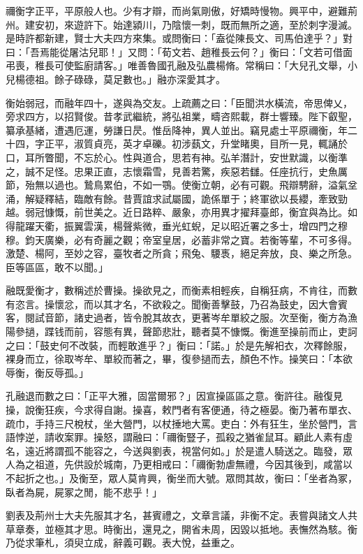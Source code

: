 \begin{pinyinscope}
禰衡字正平，平原般人也。少有才辯，而尚氣剛傲，好矯時慢物。興平中，避難荊州。建安初，來遊許下。始達潁川，乃陰懷一刺，既而無所之適，至於刺字漫滅。是時許都新建，賢士大夫四方來集。或問衡曰：「盍從陳長文、司馬伯達乎？」對曰：「吾焉能從屠沽兒耶！」又問：「荀文若、趙稚長云何？」衡曰：「文若可借面弔喪，稚長可使監廚請客。」唯善魯國孔融及弘農楊脩。常稱曰：「大兒孔文舉，小兒楊德祖。餘子碌碌，莫足數也。」融亦深愛其才。

衡始弱冠，而融年四十，遂與為交友。上疏薦之曰：「臣聞洪水橫流，帝思俾乂，旁求四方，以招賢俊。昔孝武繼統，將弘祖業，疇咨熙載，群士響臻。陛下叡聖，纂承基緒，遭遇厄運，勞謙日昃。惟岳降神，異人並出。竊見處士平原禰衡，年二十四，字正平，淑質貞亮，英才卓礫。初涉蓺文，升堂睹奧，目所一見，輒誦於口，耳所瞥聞，不忘於心。性與道合，思若有神。弘羊潛計，安世默識，以衡準之，誠不足怪。忠果正直，志懷霜雪，見善若驚，疾惡若讎。任座抗行，史魚厲節，殆無以過也。鷙鳥累伯，不如一鶚。使衡立朝，必有可觀。飛辯騁辭，溢氣坌涌，解疑釋結，臨敵有餘。昔賈誼求試屬國，詭係單于；終軍欲以長纓，牽致勁越。弱冠慷慨，前世美之。近日路粹、嚴象，亦用異才擢拜臺郎，衡宜與為比。如得龍躍天衢，振翼雲漢，楊聲紫微，垂光虹蜺，足以昭近署之多士，增四門之穆穆。鈞天廣樂，必有奇麗之觀；帝室皇居，必蓄非常之寶。若衡等輩，不可多得。激楚、楊阿，至妙之容，臺牧者之所貪；飛兔、騕褭，絕足奔放，良、樂之所急。臣等區區，敢不以聞。」

融既愛衡才，數稱述於曹操。操欲見之，而衡素相輕疾，自稱狂病，不肯往，而數有恣言。操懷忿，而以其才名，不欲殺之。聞衡善擊鼓，乃召為鼓史，因大會賓客，閱試音節，諸史過者，皆令脫其故衣，更著岑牟單絞之服。次至衡，衡方為漁陽參撾，蹀钱而前，容態有異，聲節悲壯，聽者莫不慷慨。衡進至操前而止，吏訶之曰：「鼓史何不改裝，而輕敢進乎？」衡曰：「諾。」於是先解衵衣，次釋餘服，裸身而立，徐取岑牟、單絞而著之，畢，復參撾而去，顏色不怍。操笑曰：「本欲辱衡，衡反辱孤。」

孔融退而數之曰：「正平大雅，固當爾邪？」因宣操區區之意。衡許往。融復見操，說衡狂疾，今求得自謝。操喜，敕門者有客便通，待之極晏。衡乃著布單衣、疏巾，手持三尺梲杖，坐大營門，以杖捶地大罵。吏白：外有狂生，坐於營門，言語悖逆，請收案罪。操怒，謂融曰：「禰衡豎子，孤殺之猶雀鼠耳。顧此人素有虛名，遠近將謂孤不能容之，今送與劉表，視當何如。」於是遣人騎送之。臨發，眾人為之祖道，先供設於城南，乃更相戒曰：「禰衡勃虐無禮，今因其後到，咸當以不起折之也。」及衡至，眾人莫肯興，衡坐而大號。眾問其故，衡曰：「坐者為冢，臥者為屍，屍冢之閒，能不悲乎！」

劉表及荊州士大夫先服其才名，甚賓禮之，文章言議，非衡不定。表嘗與諸文人共草章奏，並極其才思。時衡出，還見之，開省未周，因毀以抵地。表憮然為駭。衡乃從求筆札，須臾立成，辭義可觀。表大悅，益重之。


\end{pinyinscope}
